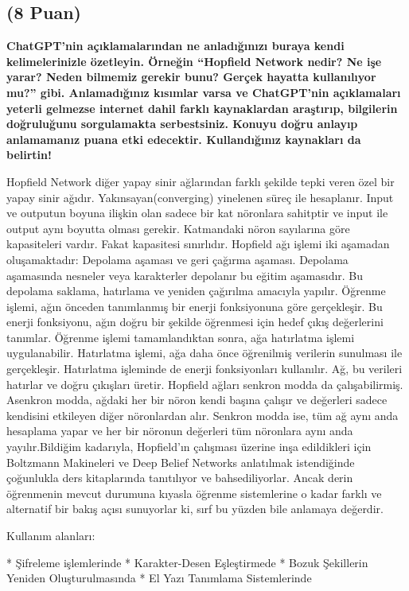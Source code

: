 \documentclass[11pt]{article}
\begin{document}
\subsection{(8 Puan)} \textbf{ChatGPT’nin açıklamalarından ne anladığınızı buraya kendi kelimelerinizle özetleyin. Örneğin ``Hopfield Network nedir? Ne işe yarar? Neden bilmemiz gerekir bunu? Gerçek hayatta kullanılıyor mu?'' gibi. Anlamadığınız kısımlar varsa ve ChatGPT’nin açıklamaları yeterli gelmezse internet dahil farklı kaynaklardan araştırıp, bilgilerin doğruluğunu sorgulamakta serbestsiniz. Konuyu doğru anlayıp anlamamanız puana etki edecektir. Kullandığınız kaynakları da belirtin!}

Hopfield Network diğer yapay sinir ağlarından farklı şekilde tepki veren özel bir yapay sinir ağıdır. Yakınsayan(converging) yinelenen süreç ile hesaplanır.
Input ve outputun boyuna ilişkin olan sadece bir kat nöronlara sahitptir ve input ile output aynı boyutta olması gerekir. Katmandaki nöron sayılarına göre kapasiteleri vardır. Fakat kapasitesi sınırlıdır. Hopfield ağı işlemi iki aşamadan oluşamaktadır: Depolama aşaması ve geri çağırma aşaması. Depolama aşamasında nesneler veya karakterler depolanır bu eğitim aşamasıdır. Bu depolama saklama, hatırlama ve yeniden çağırılma amacıyla yapılır. Öğrenme işlemi, ağın önceden tanımlanmış bir enerji fonksiyonuna göre gerçekleşir. Bu enerji fonksiyonu, ağın doğru bir şekilde öğrenmesi için hedef çıkış değerlerini tanımlar. Öğrenme işlemi tamamlandıktan sonra, ağa hatırlatma işlemi uygulanabilir. Hatırlatma işlemi, ağa daha önce öğrenilmiş verilerin sunulması ile gerçekleşir. Hatırlatma işleminde de enerji fonksiyonları kullanılır. Ağ, bu verileri hatırlar ve doğru çıkışları üretir. Hopfield ağları senkron modda da çalışabilirmiş. Asenkron modda, ağdaki her bir nöron kendi başına çalışır ve değerleri sadece kendisini etkileyen diğer nöronlardan alır. Senkron modda ise, tüm ağ aynı anda hesaplama yapar ve her bir nöronun değerleri tüm nöronlara aynı anda yayılır.Bildiğim kadarıyla, Hopfield'ın çalışması üzerine inşa edildikleri için Boltzmann Makineleri ve Deep Belief Networks anlatılmak istendiğinde çoğunlukla ders kitaplarında tanıtılıyor ve bahsediliyorlar. Ancak derin öğrenmenin mevcut durumuna kıyasla öğrenme sistemlerine o kadar farklı ve alternatif bir bakış açısı sunuyorlar ki, sırf bu yüzden bile anlamaya değerdir.  

 Kullanım alanları:

    * Şifreleme işlemlerinde
    * Karakter-Desen Eşleştirmede
    * Bozuk Şekillerin Yeniden Oluşturulmasında
    * El Yazı Tanımlama Sistemlerinde
\end{document}
